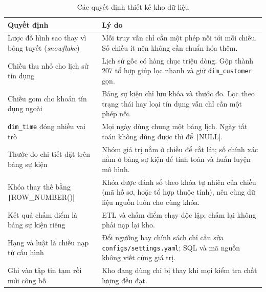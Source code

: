 \begin{table}[H]
	\centering
	\caption{Các quyết định thiết kế kho dữ liệu}
	\label{tab:design-decisions}
	\footnotesize
	\begin{tabular}{p{4.6cm} p{11cm}}
		\toprule
		\textbf{Quyết định}                                                       & \textbf{Lý do}                                                                                                            \\
		\midrule
		Lược đồ hình sao thay vì bông tuyết (\textit{snowflake})                  & Mỗi truy vấn chỉ cần một phép nối tới mỗi chiều. Số chiều ít nên không cần chuẩn hóa thêm.                                \\
		Chiều thu nhỏ cho lịch sử tín dụng                                        & Lịch sử gốc có hàng chục triệu dòng. Gộp thành $207$ tổ hợp giúp lọc nhanh và giữ \texttt{dim\_customer} gọn.             \\
		Chiều gom cho khoản tín dụng ngoài                                        & Bảng sự kiện chỉ lưu khóa và thước đo. Lọc theo trạng thái hay loại tín dụng vẫn chỉ cần một phép nối.                    \\
		\texttt{dim\_time} đóng nhiều vai trò                                     & Mọi ngày dùng chung một bảng lịch. Ngày tất toán không dùng được thì để \texttt|NULL|.   \\
		Thước đo chi tiết đặt trên bảng sự kiện                                   & Nhóm giá trị nằm ở chiều để cắt lát; số chính xác nằm ở bảng sự kiện để tính toán và huấn luyện mô hình.                  \\
		Khóa thay thế bằng \texttt|ROW_NUMBER()| & Khóa được đánh số theo khóa tự nhiên của chiều (mã hồ sơ, hoặc tổ hợp thuộc tính), nên cùng dữ liệu nguồn luôn cho cùng khóa. \\
		Kết quả chấm điểm là bảng sự kiện riêng                                   & ETL và chấm điểm chạy độc lập; chấm lại không phải nạp lại kho.                                                           \\
		Hạng và luật là chiều nạp từ cấu hình                                     & Đổi ngưỡng hay chính sách chỉ cần sửa \texttt{configs/settings.yaml}; SQL và mã nguồn không viết cứng giá trị.            \\
		Ghi vào tập tin tạm rồi mới công bố                                       & Kho đang dùng chỉ bị thay khi mọi kiểm tra chất lượng đều đạt.                                                            \\
		\bottomrule
	\end{tabular}
\end{table}


